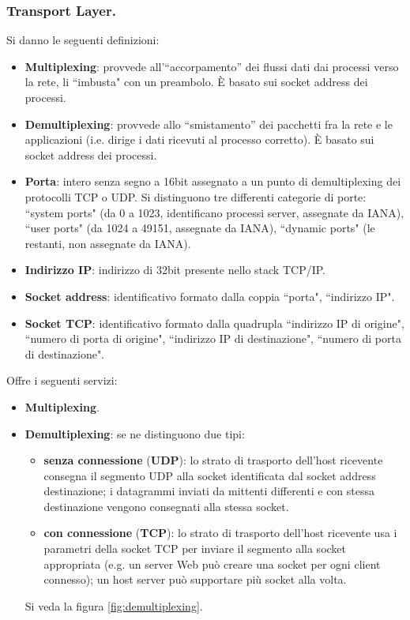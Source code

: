 \documentclass[11pt, italian, openany]{book}
\begin{document}
\begin{sloppypar}
\subsubsection{Transport Layer.}
Si danno le seguenti definizioni:
\begin{itemize}[topsep=0pt, itemsep=0pt, parsep=0pt]
	\item \textbf{Multiplexing}: provvede all'``accorpamento” dei flussi dati dai processi verso la rete, li ``imbusta" con un preambolo. \`E
	basato sui socket address dei processi.
	\item \textbf{Demultiplexing}: provvede allo ``smistamento” dei pacchetti fra la rete e le applicazioni (i.e. dirige i dati ricevuti al
	processo corretto). \`E basato sui socket address dei processi.
	\item \textbf{Porta}: intero senza segno a 16bit assegnato a un punto di demultiplexing dei protocolli TCP o UDP. Si distinguono tre differenti
	categorie di porte: ``system ports" (da 0 a 1023, identificano processi server, assegnate da IANA), ``user ports" (da 1024 a 49151, assegnate
	da IANA), ``dynamic ports" (le restanti, non assegnate da IANA).
	\item \textbf{Indirizzo IP}: indirizzo di 32bit presente nello stack TCP/IP.
	\item \textbf{Socket address}: identificativo formato dalla coppia ``porta", ``indirizzo IP".
	\item \textbf{Socket TCP}: identificativo formato dalla quadrupla ``indirizzo IP di origine", ``numero di porta di origine", ``indirizzo IP di
	destinazione", ``numero di porta di destinazione".
\end{itemize}

Offre i seguenti servizi:
\begin{itemize}[topsep=0pt, itemsep=0pt, parsep=0pt]
	\item \textbf{Multiplexing}.
	\item \textbf{Demultiplexing}: se ne distinguono due tipi:
	\begin{itemize}[topsep=0pt, itemsep=0pt, parsep=0pt]
		\item \textbf{senza connessione} (\textbf{UDP}): lo strato di trasporto dell'host ricevente consegna il segmento UDP alla socket
		identificata dal socket address destinazione; i datagrammi inviati da mittenti differenti e con stessa destinazione vengono consegnati
		alla stessa socket.
		\item \textbf{con connessione} (\textbf{TCP}): lo strato di trasporto dell'host ricevente usa i parametri della socket TCP per inviare il
		segmento alla socket appropriata (e.g. un server Web pu\`o creare una socket per ogni client connesso); un host server pu\`o supportare
		pi\`u socket alla volta.
	\end{itemize}
	Si veda la figura \ref{fig:demultiplexing}.
	

\end{itemize}
\end{sloppypar}
\end{document}
